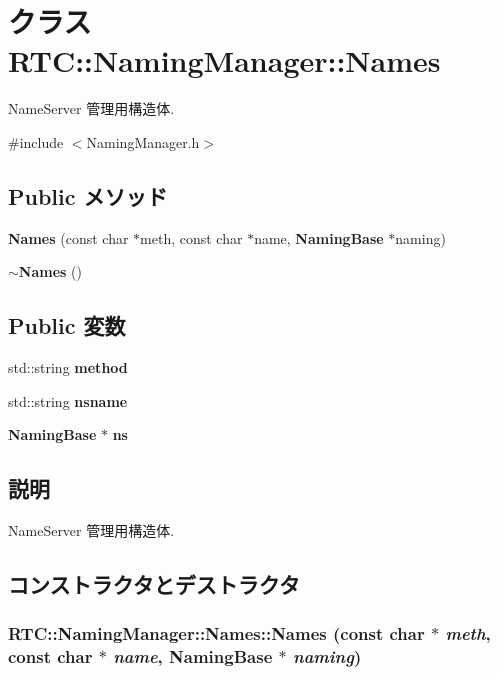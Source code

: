 \section{クラス RTC::NamingManager::Names}
\label{classRTC_1_1NamingManager_1_1Names}


NameServer 管理用構造体.  




{\ttfamily \#include $<$NamingManager.h$>$}

\subsection*{Public メソッド}
\begin{DoxyCompactItemize}
\item 
{\bf Names} (const char $\ast$meth, const char $\ast$name, {\bf NamingBase} $\ast$naming)
\item 
{\bf $\sim$Names} ()
\end{DoxyCompactItemize}
\subsection*{Public 変数}
\begin{DoxyCompactItemize}
\item 
std::string {\bf method}
\item 
std::string {\bf nsname}
\item 
{\bf NamingBase} $\ast$ {\bf ns}
\end{DoxyCompactItemize}


\subsection{説明}
NameServer 管理用構造体. 

\subsection{コンストラクタとデストラクタ}
\subsubsection[{Names}]{\setlength{\rightskip}{0pt plus 5cm}RTC::NamingManager::Names::Names (const char $\ast$ {\em meth}, \/  const char $\ast$ {\em name}, \/  {\bf NamingBase} $\ast$ {\em naming})\hspace{0.3cm}{\ttfamily  [inline]}}\label{classRTC_1_1NamingManager_1_1Names_a41f1f4ab7a1312266066594e550105c2}

